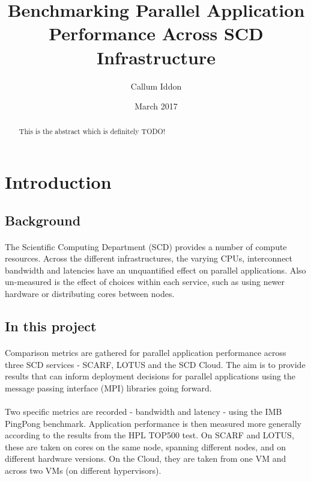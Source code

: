 \documentclass{article}
\title{Benchmarking Parallel Application Performance Across SCD Infrastructure}
\author{Callum Iddon }
\date{March 2017}
\begin{document}

\maketitle

\begin{abstract}
This is the abstract which is definitely TODO!
\end{abstract}


\tableofcontents

\section{Introduction}

    \subsection{Background}
        \paragraph{}
        The Scientific Computing Department (SCD) provides a number of compute resources. Across the different infrastructures, the varying CPUs, interconnect bandwidth and latencies have an unquantified effect on parallel applications. Also un-measured is the effect of choices within each service, such as using newer hardware or distributing cores between nodes.

    \subsection{In this project}
        \paragraph{}
        Comparison metrics are gathered for parallel application performance across three SCD services - SCARF, LOTUS and the SCD Cloud. The aim is to provide results that can inform deployment decisions for parallel applications using the message passing interface (MPI) libraries going forward.

        \paragraph{}
        Two specific metrics are recorded - bandwidth and latency - using the IMB PingPong benchmark. Application performance is then measured more generally according to the results from the HPL TOP500 test. On SCARF and LOTUS, these are taken on cores on the same node, spanning different nodes, and on different hardware versions. On the Cloud, they are taken from one VM and across two VMs (on different hypervisors).
\end{document}
